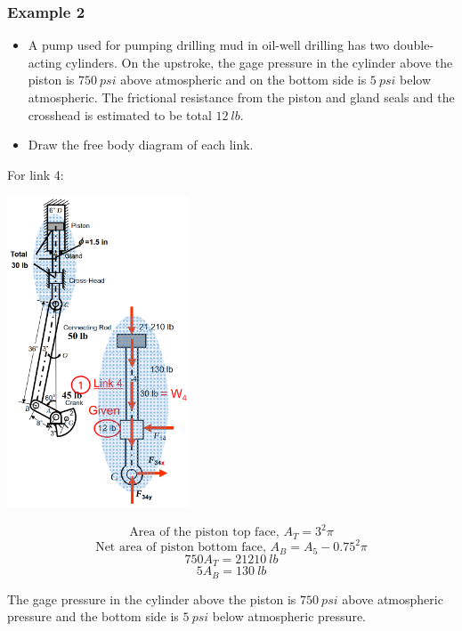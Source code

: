 \documentclass[11pt]{article}
\begin{document}
 \newpage
\subsubsection{Example 2}
\label{sec:orgc5408f4}
\begin{itemize}
\item A pump used for pumping drilling mud in oil-well drilling has two double-acting cylinders. On the upstroke, the gage pressure in the cylinder above the piston is \(\qty{750}{psi}\) above atmospheric and on the bottom side is \(\qty{5}{psi}\) below atmospheric. The frictional resistance from the piston and gland seals and the crosshead is estimated to be total \(\qty{12}{lb}\).
\item Draw the free body diagram of each link.
\end{itemize}

For link 4:
\begin{center}
\includegraphics[height=25em]{./images/example-2-link-4-free-body-diagram.png}
\end{center}

\[\text{Area of the piston top face, } A_T = 3^2 \pi\]
\[\text{Net area of piston bottom face, } A_B = A_5 - 0.75^2 \pi\]
\[750A_T = \qty{21210}{lb}\]
\[5A_B = \qty{130}{lb}\]

The gage pressure in the cylinder above the piston is \(\qty{750}{psi}\) above atmospheric pressure and the bottom side is \(\qty{5}{psi}\) below atmospheric pressure.

 \newpage
\end{document}
